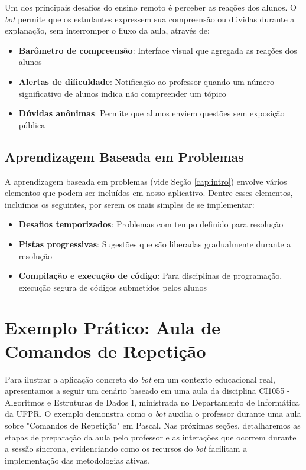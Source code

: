 Um dos principais desafios do ensino remoto é perceber as reações dos alunos. O
\textit{bot} permite que os estudantes expressem sua compreensão ou dúvidas
durante a explanação, sem interromper o fluxo da aula, através de:

\begin{itemize}
\item \textbf{Barômetro de compreensão}: Interface visual que agregada as
reações dos alunos
\item \textbf{Alertas de dificuldade}: Notificação ao professor quando um número
significativo de alunos indica não compreender um tópico
\item \textbf{Dúvidas anônimas}: Permite que alunos enviem questões sem
exposição pública
\end{itemize}

\subsection{Aprendizagem Baseada em Problemas}
\label{subsec:pbl}

A aprendizagem baseada em problemas (vide Seção \ref{cap:intro}) envolve vários
elementos que podem ser incluídos em nosso aplicativo. Dentre esses elementos,
incluímos os seguintes, por serem os mais simples de se implementar:

\begin{itemize}
\item \textbf{Desafios temporizados}: Problemas com tempo definido para
resolução
\item \textbf{Pistas progressivas}: Sugestões que são liberadas gradualmente
durante a resolução
\item \textbf{Compilação e execução de código}: Para disciplinas de programação,
execução segura de códigos submetidos pelos alunos
\end{itemize}

\section{Exemplo Prático: Aula de Comandos de Repetição}
\label{sec:exemplo}

Para ilustrar a aplicação concreta do \textit{bot} em um contexto educacional
real, apresentamos a seguir um cenário baseado em uma aula da disciplina CI1055
- Algoritmos e Estruturas de Dados I, ministrada no Departamento de Informática
da UFPR. O exemplo demonstra como o \textit{bot} auxilia o professor durante uma
aula sobre "Comandos de Repetição" em Pascal. Nas próximas seções, detalharemos
as etapas de preparação da aula pelo professor e as interações que ocorrem
durante a sessão síncrona, evidenciando como os recursos do \textit{bot}
facilitam a implementação das metodologias ativas.

